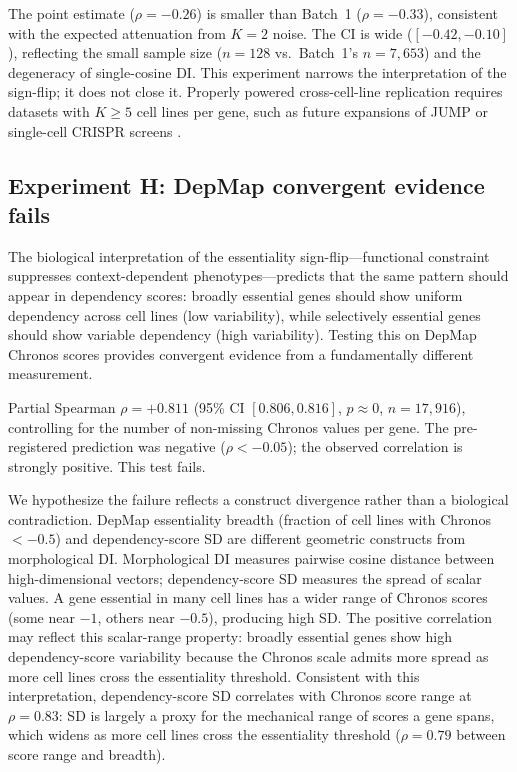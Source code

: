 \documentclass[11pt]{article}
\begin{document}
The point estimate ($\rho = -0.26$) is smaller than Batch~1
($\rho = -0.33$), consistent with the expected attenuation from $K = 2$
noise.  The CI is wide ($[-0.42, -0.10]$), reflecting the small
sample size ($n = 128$ vs.\ Batch~1's $n = 7{,}653$) and the
degeneracy of single-cosine DI.  This experiment narrows the
interpretation of the sign-flip; it does not close it.  Properly powered
cross-cell-line replication requires datasets with $K \geq 5$ cell
lines per gene, such as future expansions of JUMP or single-cell CRISPR
screens \citep{tahoe2025}.

\subsection{Experiment H: DepMap convergent evidence fails}

The biological interpretation of the essentiality sign-flip---functional
constraint suppresses context-dependent phenotypes---predicts that the
same pattern should appear in dependency scores: broadly essential genes
should show uniform dependency across cell lines (low variability),
while selectively essential genes should show variable dependency (high
variability).  Testing this on DepMap Chronos scores provides convergent
evidence from a fundamentally different measurement.

Partial Spearman $\rho = +0.811$ (95\% CI $[0.806, 0.816]$,
$p \approx 0$, $n = 17{,}916$), controlling for the number of
non-missing Chronos values per gene.  The pre-registered prediction
was negative ($\rho < -0.05$); the observed correlation is strongly
positive.  This test fails.

We hypothesize the failure reflects a construct divergence rather than
a biological contradiction.  DepMap essentiality breadth
(fraction of cell lines with Chronos $< -0.5$) and dependency-score SD
are different geometric constructs from morphological DI.  Morphological
DI measures pairwise cosine distance between high-dimensional vectors;
dependency-score SD measures the spread of scalar values.  A gene
essential in many cell lines has a wider range of Chronos
scores (some near $-1$, others near $-0.5$), producing high SD.  The
positive correlation may reflect this scalar-range property: broadly
essential genes show high dependency-score variability because
the Chronos scale admits more spread as more cell lines cross the
essentiality threshold.  Consistent with this interpretation,
dependency-score SD correlates with Chronos score range at
$\rho = 0.83$: SD is largely a proxy for the mechanical range of
scores a gene spans, which widens as more cell lines cross the
essentiality threshold ($\rho = 0.79$ between score range and
breadth).
\end{document}
